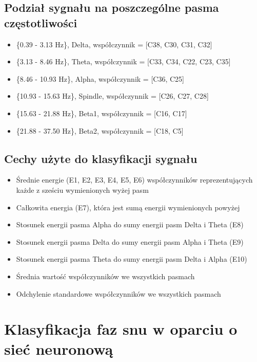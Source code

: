 \documentclass[12pt, notitlepage]{report}
\begin{document}
        \section{Podział sygnału na poszczególne pasma częstotliwości}
        \begin{itemize}
            \item \{0.39 - 3.13 Hz\}, Delta, współczynnik = [C38, C30, C31, C32]
            \item \{3.13 - 8.46 Hz\}, Theta, współczynnik = [C33, C34, C22, C23, C35]
            \item \{8.46 - 10.93 Hz\}, Alpha, współczynnik = [C36, C25]
            \item \{10.93 - 15.63 Hz\}, Spindle, współczynnik = [C26, C27, C28]
            \item \{15.63 - 21.88 Hz\}, Beta1, współczynnik = [C16, C17]
            \item \{21.88 - 37.50 Hz\}, Beta2, współczynnik = [C18, C5]         
        \end{itemize}

        \section{Cechy użyte do klasyfikacji sygnału}
        \begin{itemize}
            \item Średnie energie (E1, E2, E3, E4, E5, E6) współczynników reprezentujących każde z sześciu wymienionych wyżej pasm
            \item Całkowita energia (E7), która jest sumą energii wymienionych powyżej
            \item Stosunek energii pasma Alpha do sumy energii pasm Delta i Theta (E8)
            \item Stosunek energii pasma Delta do sumy energii pasm Alpha i Theta (E9)
            \item Stosunek energii pasma Theta do sumy energii pasm Delta i Alpha (E10)
            \item Średnia wartość współczynników we wszystkich pasmach
            \item Odchylenie standardowe współczynników we wszystkich pasmach
        \end{itemize}

    \chapter{Klasyfikacja faz snu w oparciu o sieć neuronową}
\end{document}
